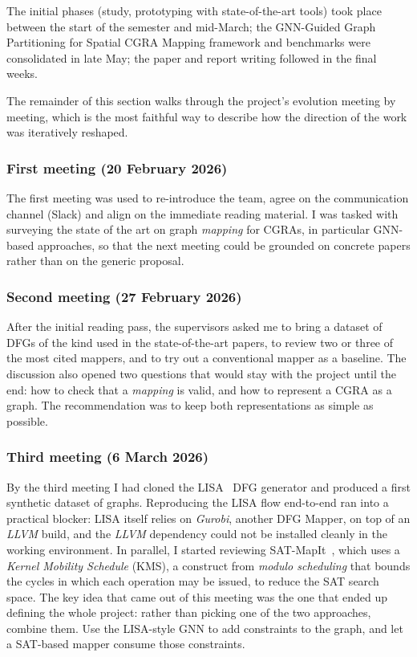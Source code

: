 \documentclass[10pt]{article}
\begin{document}
The initial phases (study, prototyping with state-of-the-art tools) took place between the start of the semester and mid-March;
the GNN-Guided Graph Partitioning for Spatial CGRA Mapping framework and benchmarks were consolidated in late May;
the paper and report writing followed in the final weeks.

The remainder of this section walks through the project's evolution
meeting by meeting, which is the most faithful way to describe how the
direction of the work was iteratively reshaped.

\subsubsection{First meeting (20 February 2026)}

The first meeting was used to re-introduce the team, agree on the
communication channel (Slack) and align on the immediate reading
material. I was tasked with surveying the state of the art on graph
\textit{mapping} for CGRAs, in particular GNN-based approaches, so that
the next meeting could be grounded on concrete papers rather than on the
generic proposal.

\subsubsection{Second meeting (27 February 2026)}

After the initial reading pass, the supervisors asked me to bring a
dataset of DFGs of the kind used in the state-of-the-art papers, to
review two or three of the most cited mappers, and to try out a
conventional mapper as a baseline. The discussion also opened two
questions that would stay with the project until the end: how to check
that a \textit{mapping} is valid, and how to represent a CGRA as a
graph. The recommendation was to keep both representations as simple as
possible.

\subsubsection{Third meeting (6 March 2026)}

By the third meeting I had cloned the LISA~\cite{lisa2022} DFG generator
and produced a first synthetic dataset of graphs. Reproducing the LISA
flow end-to-end ran into a practical blocker: LISA itself relies on
\textit{Gurobi}, another DFG Mapper, on top of an \textit{LLVM} build, and the \textit{LLVM} dependency could not be
installed cleanly in the working environment. In parallel, I started
reviewing SAT-MapIt~\cite{satmapit2023}, which uses a \textit{Kernel Mobility
	Schedule} (KMS), a construct from \textit{modulo scheduling} that bounds the
cycles in which each operation may be issued, to reduce the SAT search
space. The key idea that came out of this meeting was the one that ended up
defining the whole project: rather than picking one of the two
approaches, combine them. Use the LISA-style GNN to add constraints to
the graph, and let a SAT-based mapper consume those constraints.
\end{document}
